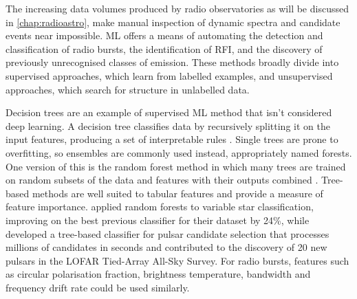 


The increasing data volumes produced by radio observatories as will be discussed in \cref{chap:radioastro}, make manual inspection of dynamic spectra and candidate events near impossible. ML offers a means of automating the detection and classification of radio bursts, the identification of RFI, and the discovery of previously unrecognised classes of emission. These methods broadly divide into supervised approaches, which learn from labelled examples, and unsupervised approaches, which search for structure in unlabelled data. 

Decision trees are an example of supervised ML method that isn't considered deep learning. A decision tree classifies data by recursively splitting it on the input features, producing a set of interpretable rules \citep{breiman_classification_1984}. Single trees are prone to overfitting, so ensembles are commonly used instead, appropriately named forests. One version of this is the random forest method in which many trees are trained on random subsets of the data and features with their outputs combined \citep{breiman_random_2001, chen_xgboost_2016}. Tree-based methods are well suited to tabular features and provide a measure of feature importance. \cite{richards_machine-learned_2011} applied random forests to variable star classification, improving on the best previous classifier for their dataset by 24\%, while \cite{lyon_fifty_2016} developed a tree-based classifier for pulsar candidate selection that processes millions of candidates in seconds and contributed to the discovery of 20 new pulsars in the LOFAR Tied-Array All-Sky Survey. For radio bursts, features such as circular polarisation fraction, brightness temperature, bandwidth and frequency drift rate could be used similarly. 

